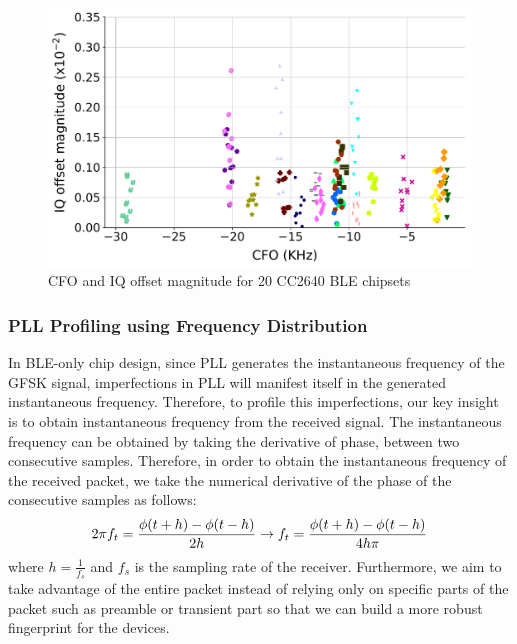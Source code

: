 \begin{figure}[t!]
    \centering
    \includegraphics[width = \linewidth]{plots/TI_CFOIQ.pdf} 
    \caption{CFO and IQ offset magnitude for 20 CC2640 BLE chipsets}
    \label{fig:ti}
\end{figure}



\subsubsection{PLL Profiling using Frequency Distribution}

In BLE-only chip design, since PLL generates the instantaneous frequency of the GFSK signal, imperfections in PLL will manifest itself in the generated instantaneous frequency. Therefore, to profile this imperfections, our key insight is to obtain instantaneous frequency from the received signal. The instantaneous frequency can be obtained by taking the derivative of phase, between two consecutive samples.  Therefore, in order to obtain the instantaneous frequency of the received packet, we take the numerical derivative of the phase of the consecutive samples as follows:
\begin{equation}
\centering
    2\pi f_t = \frac{\phi(t+h)-\phi(t-h)}{2h} \rightarrow f_t = \frac{\phi(t+h)-\phi(t-h)}{4h\pi}
\end{equation}
where $h = \frac{1}{f_s}$ and $f_s$ is the sampling rate of the receiver. Furthermore, we aim to take advantage of the entire packet instead of relying only on specific parts of the packet such as preamble or transient part so that we can build a more robust fingerprint for the devices.

